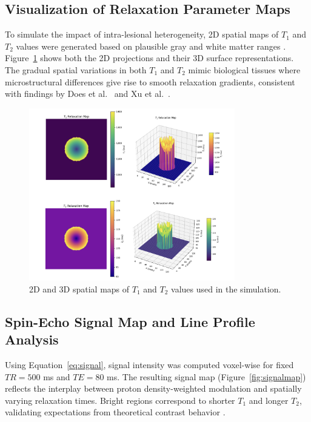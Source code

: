 \documentclass[10pt,a4paper,twoside]{article}
\begin{document}
\subsection{Visualization of Relaxation Parameter Maps}

To simulate the impact of intra-lesional heterogeneity, 2D spatial maps of \( T_1 \) and \( T_2 \) values were generated based on plausible gray and white matter ranges \cite{stanisz2005, bojorquez2017}. Figure~\ref{fig:t1t2maps} shows both the 2D projections and their 3D surface representations. The gradual spatial variations in both \( T_1 \) and \( T_2 \) mimic biological tissues where microstructural differences give rise to smooth relaxation gradients, consistent with findings by Does et al.\ \cite{does2002} and Xu et al.\ \cite{xu2009}.

\begin{figure}[htbp!]
\centering
\includegraphics[width=0.8\textwidth]{t1t2maps.png}
\caption{2D and 3D spatial maps of \( T_1 \) and \( T_2 \) values used in the simulation.}
\label{fig:t1t2maps}
\end{figure}


\subsection{Spin-Echo Signal Map and Line Profile Analysis}

Using Equation~\eqref{eq:signal}, signal intensity was computed voxel-wise for fixed \( TR = 500 \) ms and \( TE = 80 \) ms. The resulting signal map (Figure~\ref{fig:signalmap}) reflects the interplay between proton density-weighted modulation and spatially varying relaxation times. Bright regions correspond to shorter \( T_1 \) and longer \( T_2 \), validating expectations from theoretical contrast behavior \cite{bernstein2004, brown2014}.
\end{document}
